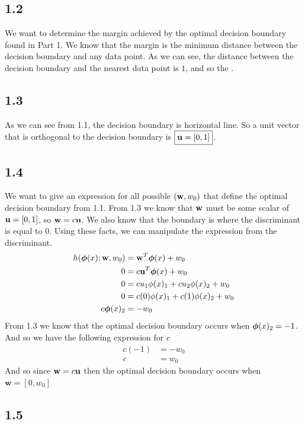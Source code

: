\documentclass[submit]{harvardml}
\begin{document}
\subsection*{1.2}

We want to determine the margin achieved by the optimal decision boundary found in Part 1. We know that the margin is the minimum distance between the decision boundary and any data point. As we can see, the distance between the decision boundary and the nearest data point is $1$, and so the .

\subsection*{1.3}

As we can see from 1.1, the decision boundary is horizontal line. So a unit vector that is orthogonal to the decision boundary is $\boxed{\vb{u} =[0, 1]}$.

\subsection*{1.4}

We want to give an expression for all possible $(\vb{w}, w_0)$ that define the optimal decision boundary from 1.1. From 1.3 we know that $\vb{w}$ must be some scalar of $\vb{u} = [0, 1]$, so $\textbf{w} = c \vb{u}$. We also know that the boundary is where the discriminant is equal to $0$. Using these facts, we can manipulate the expression from the discriminant.
\begin{align*}
    h(\boldsymbol{\phi}(x); \vb{w}, w_0) &= \vb{w}^T \boldsymbol{\phi}(x) + w_0 \\
    0 &= c \vb{u}^T \boldsymbol{\phi}(x) + w_0 \\
    0 &= c u_1 \phi(x)_1 + c u_2 \phi(x)_2 + w_0 \\
    0 &= c (0) \phi(x)_1 + c (1) \phi(x)_2 + w_0 \\
    c \boldsymbol{\phi}(x)_2 &= - w_0 \\
\end{align*}
From 1.3 we know that the optimal decision boundary occurs when $\boldsymbol{\phi}(x)_2 = -1$. And so we have the following expression for $c$
\begin{align*}
    c(-1) &= -w_0 \\
    c &= w_0
\end{align*}
And so since $\textbf{w} = c \vb{u}$ then the optimal decision boundary occurs when $\boxed{\textbf{w} = [0, w_0]}$

\subsection*{1.5}
\end{document}

